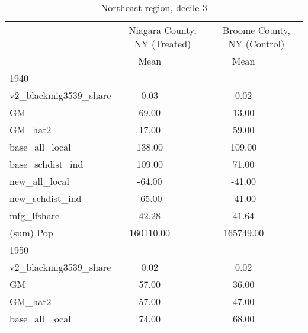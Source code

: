 \begin{table}[htbp]\centering
\def\sym#1{\ifmmode^{#1}\else\(^{#1}\)\fi}
\caption{Northeast region, decile 3 \label{tab1}}
\begin{tabular}{l*{2}{ccc}}
\toprule
                    &\multicolumn{3}{c}{Niagara County, NY (Treated)}&\multicolumn{3}{c}{Broome County, NY (Control)}\\
                    &        Mean&            &            &        Mean&            &            \\
\midrule
1940                &            &            &            &            &            &            \\
v2\_blackmig3539\_share&        0.03&            &            &        0.02&            &            \\
GM                  &       69.00&            &            &       13.00&            &            \\
GM\_hat2             &       17.00&            &            &       59.00&            &            \\
base\_all\_local      &      138.00&            &            &      109.00&            &            \\
base\_schdist\_ind    &      109.00&            &            &       71.00&            &            \\
new\_all\_local       &      -64.00&            &            &      -41.00&            &            \\
new\_schdist\_ind     &      -65.00&            &            &      -41.00&            &            \\
mfg\_lfshare         &       42.28&            &            &       41.64&            &            \\
(sum) Pop           &   160110.00&            &            &   165749.00&            &            \\
\midrule
1950                &            &            &            &            &            &            \\
v2\_blackmig3539\_share&        0.02&            &            &        0.02&            &            \\
GM                  &       57.00&            &            &       36.00&            &            \\
GM\_hat2             &       57.00&            &            &       47.00&            &            \\
base\_all\_local      &       74.00&            &            &       68.00&            &            \\

\end{tabular}
\end{table}
